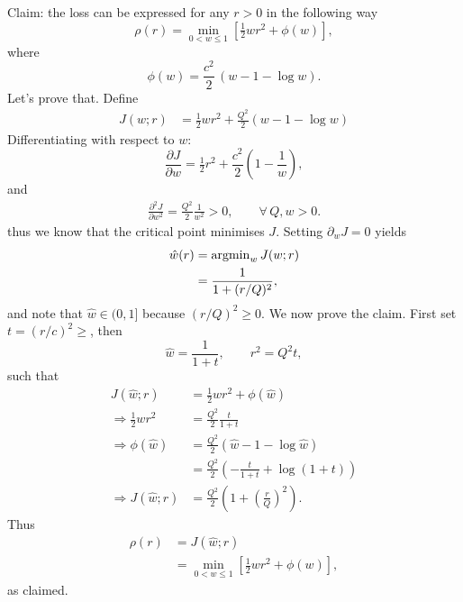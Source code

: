 \documentclass[11pt]{article}
\begin{document}
Claim: the loss can be expressed for any $r>0$ in the following way
\begin{equation}
    \rho(r) = \min_{0<w\leq1} \left[ \tfrac{1}{2} w r^2 + \phi(w) \right],
\end{equation}
where
\begin{equation}
    \phi(w) = \frac{c^2}{2}\,(w - 1 - \log w).
\end{equation}
Let's prove that. Define
\begin{align}
    J\left( w ; r \right) &= \tfrac{1}{2} w r^2 + \tfrac{Q^2}{2} \left( w - 1 - \log{w}\right)
\end{align}
Differentiating with respect to $w$:
\begin{equation}
    \frac{\partial J}{\partial w} 
    = \tfrac{1}{2}r^2 + \frac{c^2}{2}\left(1 - \frac{1}{w}\right),
\end{equation}
and
\begin{align}
    \frac{\partial^2 J}{\partial w^2} = \frac{Q^2}{2} \frac{1}{w^2} > 0, \qquad \forall \, Q,w > 0.
\end{align}
thus we know that the critical point minimises $J$.
Setting $\partial_w J=0$ yields
\begin{align}
    \hat{w}(r) &= {\rm argmin}_w \, J (w ; r) \\
    &= \frac{1}{1 + (r/Q)^2},
\end{align}
and note that $\hat{w} \in (0, 1]$ because $(r/Q)^2 \geq 0$.
We now prove the claim. First set $t = (r/c)^2 \geq$, then
\begin{equation}
    \hat{w} = \frac{1}{1+t}, \qquad r^2 = Q^2 t,
\end{equation}
such that
\begin{align}
    J (\hat{w} ; r) &= \tfrac{1}{2} w r^2 + \phi(\hat{w}) \\
    \Rightarrow \tfrac{1}{2} w r^2 &= \frac{Q^2}{2} \frac{t}{1 + t} \\
    \Rightarrow \phi(\hat{w}) &= \frac{Q^2}{2} \left( \hat{w} - 1 - \log{\hat{w}} \right) \\
    &= \frac{Q^2}{2} \left( -\frac{t}{1 + t} + \log(1 + t) \right) \\
    \Rightarrow J (\hat{w} ; r) &= \frac{Q^2}{2} \left( 1 + \left( \tfrac{r}{Q}\right)^2 \right).
\end{align}
Thus
\begin{align}
    \rho(r) &= J ( \hat{w} ; r ) \\
    &= \min_{0<w\leq1} \left[ \tfrac{1}{2} w r^2 + \phi(w) \right],
\end{align}
as claimed.
\end{document}
